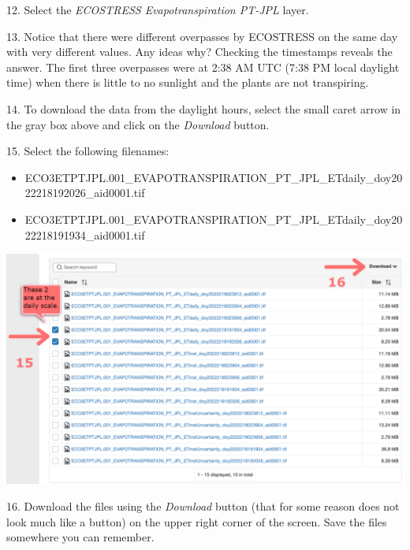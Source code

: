 \documentclass[oneside,a4paper,11pt,explicit]{book}
\begin{document}
\vspace{.5em}

12. Select the \textit{ECOSTRESS Evapotranspiration PT-JPL} layer.

13. Notice that there were different overpasses by ECOSTRESS on the same day with very different values. Any ideas why? Checking the timestamps reveals the answer. The first three overpasses were at 2:38 AM UTC (7:38 PM local daylight time) when there is little to no sunlight and the plants are not transpiring.

14. To download the data from the daylight hours, select the small caret arrow in the gray box above and click on the \textit{Download} button.

15. Select the following filenames:

\begin{itemize}
	\item ECO3ETPTJPL.001\_EVAPOTRANSPIRATION\_PT\_JPL\_ETdaily\_doy2022218192026\_aid0001.tif
	\item ECO3ETPTJPL.001\_EVAPOTRANSPIRATION\_PT\_JPL\_ETdaily\_doy2022218191934\_aid0001.tif
\end{itemize}

\vspace{.5em}

\centerline{\includegraphics[width=.8\textwidth]{ETdownload.png}}

\vspace{.5em}


16. Download the files using the \textit{Download} button (that for some reason does not look much like a button) on the upper right corner of the screen. Save the files somewhere you can remember. 
\end{document}

